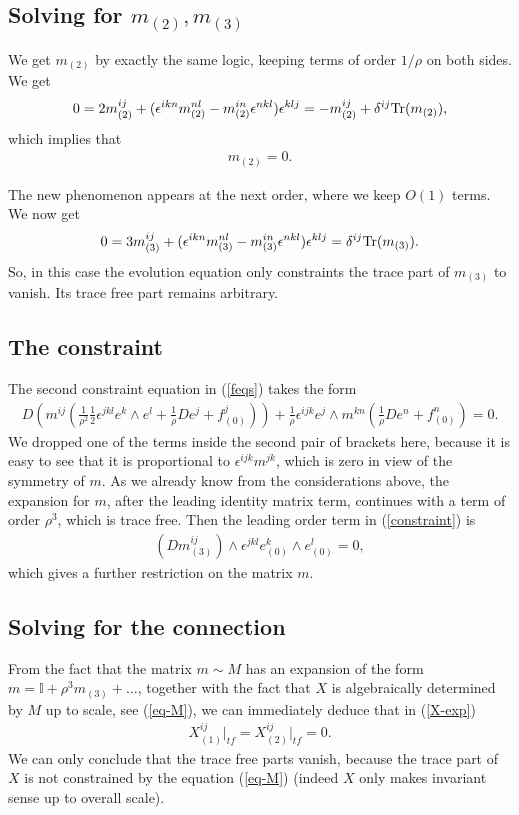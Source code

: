 \documentclass[a4paper,12pt]{article}
\newcommand{\id}{{\mathbb I}}
\newcommand{\be}{\begin{eqnarray}}
\newcommand{\ee}{\end{eqnarray}}
\begin{document}
\subsection{Solving for $m_{(2)}, m_{(3)}$}

We get $m_{(2)}$ by exactly the same logic, keeping terms of order $1/\rho$ on both sides. We get
\be
0=2m^{ij}_{(2)} + (\epsilon^{ikn} m^{nl}_{(2)} - m^{in}_{(2)} \epsilon^{nkl})\epsilon^{klj}= - m^{ij}_{(2)} + \delta^{ij} {\rm Tr}(m_{(2)}),
\ee
which implies that
\be
m_{(2)}=0.
\ee

The new phenomenon appears at the next order, where we keep $O(1)$ terms. We now get
\be
0=3m^{ij}_{(3)} + (\epsilon^{ikn} m^{nl}_{(3)} - m^{in}_{(3)} \epsilon^{nkl})\epsilon^{klj}=  \delta^{ij} {\rm Tr}(m_{(3)}).
\ee
So, in this case the evolution equation only constraints the trace part of $m_{(3)}$ to vanish. Its trace free part remains arbitrary. 

\subsection{The constraint}

The second constraint equation in (\ref{feqs}) takes the form
\be\label{constraint}
D\left( m^{ij} \left( \frac{1}{\rho^2}\frac{1}{2}\epsilon^{jkl}e^k\wedge e^l+\frac{1}{\rho}D e^j+f^j_{(0)} \right) \right)
+ \frac{1}{\rho} \epsilon^{ijk} e^j \wedge m^{kn} \left( \frac{1}{\rho}D e^n+f^n_{(0)}\right) =0.
\ee
We dropped one of the terms inside the second pair of brackets here, because it is easy to see that it is proportional to $\epsilon^{ijk} m^{jk}$, which is zero in view of the symmetry of $m$. As we already know from the considerations above, the expansion for $m$, after the leading identity matrix term, continues with a term of order $\rho^3$, which is trace free. Then the leading order term in (\ref{constraint}) is
\be
(Dm^{ij}_{(3)})\wedge \epsilon^{jkl} e^k_{(0)}\wedge e^l_{(0)}=0,
\ee
which gives a further restriction on the matrix $m$. 



\subsection{Solving for the connection}

From the fact that the matrix $m\sim M$ has an expansion of the form $m = \id + \rho^3 m_{(3)}+\ldots$, together with the fact that $X$ is algebraically determined by $M$ up to scale, see (\ref{eq-M}), we can immediately deduce that in (\ref{X-exp})
\be\label{X-12}
X_{(1)}^{ij}\Big|_{tf}= X_{(2)}^{ij}\Big|_{tf}=0.
\ee
We can only conclude that the trace free parts vanish, because the trace part of $X$ is not constrained by the equation (\ref{eq-M}) (indeed $X$ only makes invariant sense up to overall scale). 
\end{document}

